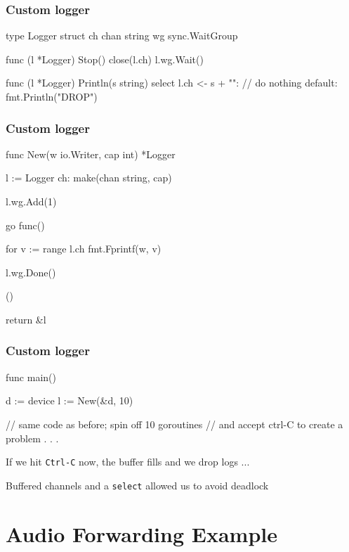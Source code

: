 \documentclass[handout,compress,t,11pt]{beamer}
\begin{document}
\begin{frame}[fragile]
    \frametitle{Custom logger}
\begin{golang}
type Logger struct {
    ch chan string
    wg sync.WaitGroup
}

func (l *Logger) Stop() {
    close(l.ch)
    l.wg.Wait()
}

func (l *Logger) Println(s string) {
    select {
    l.ch <- s + "\n":
        // do nothing
    default:
        fmt.Println("DROP")
    }
}
\end{golang}
\end{frame}

\begin{frame}[fragile]
    \frametitle{Custom logger}
\begin{golang}
func New(w io.Writer, cap int) *Logger {
    l := Logger{
        ch: make(chan string, cap)
    }
    
    l.wg.Add(1)

    go func() {
        for v := range l.ch {
            fmt.Fprintf(w, v)
        }

        l.wg.Done()
    }()

    return &l
}
\end{golang}
\end{frame}

\begin{frame}[fragile]
    \frametitle{Custom logger}
\begin{golang}
func main() {
    d := device{}
    l := New(&d, 10)

    // same code as before; spin off 10 goroutines
    // and accept ctrl-C to create a problem
    . . .
}
\end{golang}
\vspace{2\baselineskip}
If we hit \verb|Ctrl-C| now, the buffer fills and we drop logs ... \par
\vspace{2\baselineskip}
Buffered channels and a \verb|select| allowed us to avoid deadlock
\end{frame}



\section{Audio Forwarding Example}
\end{document}
